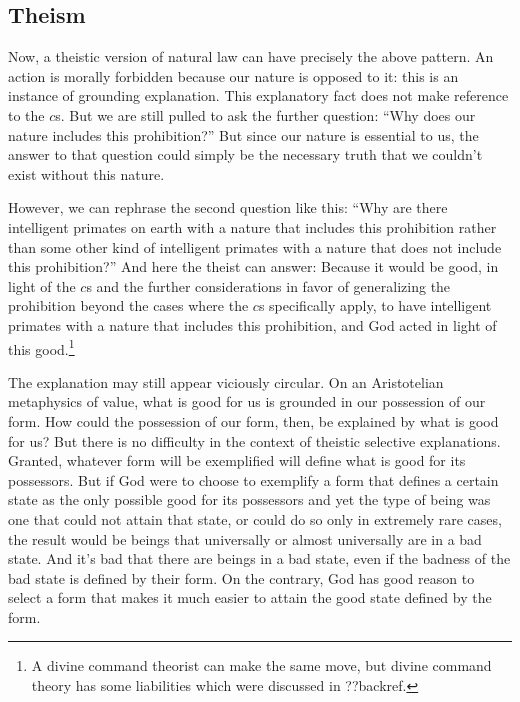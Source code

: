 \subsection{Theism}\label{sec:theistic-explanation}
Now, a theistic version of natural law can have precisely the above pattern. An action is morally forbidden because
our nature is opposed to it: this is an instance of grounding explanation. This explanatory fact does not make reference 
to the $c$s. But we are still pulled to ask the further question: ``Why does our nature 
includes this prohibition?'' But since our nature is essential to us, the answer to that question could 
simply be the necessary truth that we couldn't exist without this nature. 

However, we can rephrase the second question like this: ``Why are there intelligent primates on earth with a nature that includes this prohibition
rather than some other kind of intelligent primates with a nature that does not include this prohibition?''
And here the theist can answer: Because it would be good, in light of the $c$s and the
further considerations in favor of generalizing the prohibition beyond the cases where the $c$s specifically
apply, to have intelligent primates with a nature that includes this prohibition, and God acted in light
of this good.\footnote{A divine command theorist can make the same move, but divine command theory has some
liabilities which were discussed in ??backref.}

The explanation may still appear viciously circular. On an Aristotelian metaphysics of value, what is good for us
is grounded in our possession of our form. How could the possession of our form, then, be explained by what is good 
for us? But there is no difficulty in the context of theistic selective explanations. Granted, whatever 
form will be exemplified will define what is good for its possessors. But if God were to choose to exemplify a form
that defines a certain state as the only possible good for its possessors and yet the type of being was one that
could not attain that state, or could do so only in extremely rare cases, the result would be beings 
that universally or almost universally are in a bad state. And it's bad that there are beings in a bad state,
even if the badness of the bad state is defined by their form. On the contrary, God has good reason to select a 
form that makes it much easier to attain the good state defined by the form.

